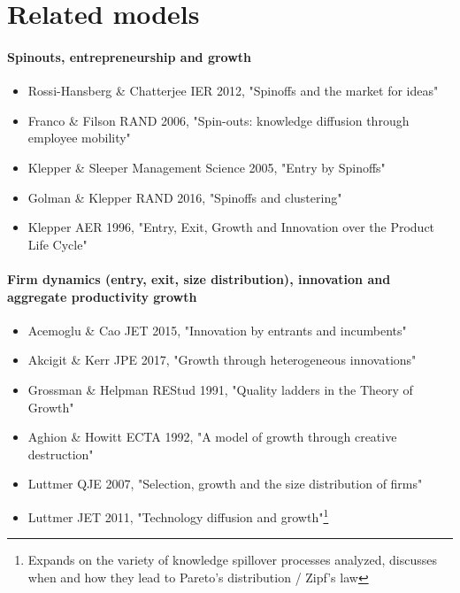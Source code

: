 \documentclass[12pt,english]{article}
\theoremstyle{remark}
\begin{document}
\section{Related models}

\paragraph{Spinouts, entrepreneurship and growth}
\begin{itemize}
	\item Rossi-Hansberg \& Chatterjee IER 2012, "Spinoffs and the market for ideas"
	\item Franco \& Filson RAND 2006, "Spin-outs: knowledge diffusion through employee mobility"
	\item Klepper \& Sleeper Management Science 2005, "Entry by Spinoffs"
	\item Golman \& Klepper RAND 2016, "Spinoffs and clustering"
	\item Klepper AER 1996, "Entry, Exit, Growth and Innovation over the Product Life Cycle"
\end{itemize}


\paragraph{Firm dynamics (entry, exit, size distribution), innovation and aggregate productivity growth}
\begin{itemize}
	\item Acemoglu \& Cao JET 2015, "Innovation by entrants and incumbents"
	\item Akcigit \& Kerr JPE 2017, "Growth through heterogeneous innovations"
	\item Grossman \& Helpman REStud 1991, "Quality ladders in the Theory of Growth"
	\item Aghion \& Howitt ECTA 1992, "A model of growth through creative destruction"
	\item Luttmer QJE 2007, "Selection, growth and the size distribution of firms"
	\item Luttmer JET 2011, "Technology diffusion and growth"\footnote{Expands on the variety of knowledge spillover processes analyzed, discusses when and how they lead to Pareto's distribution / Zipf's law}
\end{itemize}
\end{document}
